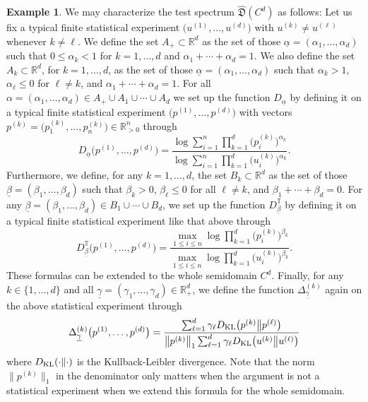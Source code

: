 \documentclass[12pt,a4paper,reqno]{amsart}
\theoremstyle{definition}
\newtheorem{example}[proposition]{Example}
\newcommand{\mf}[1]{\mathfrak{#1}}
\newcommand{\R}{\mathbb R}
\newcommand{\T}{\mathbb T}
\begin{document}
\begin{example}
We may characterize the test spectrum $\hat{\mf D}(C^d)$ as follows: Let us fix a typical finite statistical experiment $\big(u^{(1)},\ldots,u^{(d)}\big)$ with $u^{(k)}\neq u^{(\ell)}$ whenever $k\neq\ell$. We define the set $A_+\subset\R^d$ as the set of those $\underline{\alpha}=(\alpha_1,\ldots,\alpha_d)$ such that $0\leq\alpha_k<1$ for $k=1,\ldots,d$ and $\alpha_1+\cdots+\alpha_d=1$. We also define the set $A_k\subset\R^d$, for $k=1,\ldots,d$, as the set of those $\underline{\alpha}=(\alpha_1,\ldots,\alpha_d)$ such that $\alpha_k>1$, $\alpha_\ell\leq0$ for $\ell\neq k$, and $\alpha_1+\cdots+\alpha_d=1$. For all $\alpha=(\alpha_1,\ldots,\alpha_d)\in A_+\cup A_1\cup\cdots\cup A_d$ we set up the function $D_{\underline{\alpha}}$ by defining it on a typical finite statistical experiment $\big(p^{(1)},\ldots,p^{(d)}\big)$ with vectors $p^{(k)}=\big(p^{(k)}_1,\ldots,p^{(k)}_n\big)\in\R_{>0}^n$ through
\begin{equation}\label{eq:ClTemperate}
D_{\underline{\alpha}}\big(p^{(1)},\ldots,p^{(d)}\big)=\frac{\log{\sum_{i=1}^n\prod_{k=1}^d\big(p^{(k)}_i\big)^{\alpha_k}}}{\log{\sum_{i=1}^n\prod_{k=1}^d\big(u^{(k)}_i\big)^{\alpha_k}}}.
\end{equation}
Furthermore, we define, for any $k=1,\ldots,d$, the set $B_k\subset\R^d$ as the set of those $\underline{\beta}=(\beta_1,\ldots,\beta_d)$ such that $\beta_k>0$, $\beta_\ell\leq0$ for all $\ell\neq k$, and $\beta_1+\cdots+\beta_d=0$. For any $\underline{\beta}=(\beta_1,\ldots,\beta_d)\in B_1\cup\cdots\cup B_d$, we set up the function $D_{\underline{\beta}}^\T$ by defining it on a typical finite statistical experiment like that above through
\begin{equation}\label{eq:ClTropical}
D_{\underline{\beta}}^\T\big(p^{(1)},\ldots,p^{(d)}\big)=\frac{\max_{1\leq i\leq n}\log{\prod_{k=1}^d\big(p^{(k)}_i\big)^{\beta_k}}}{\max_{1\leq i\leq n}\log{\prod_{k=1}^d\big(u^{(k)}_i\big)^{\beta_k}}}.
\end{equation}
These formulas can be extended to the whole semidomain $C^d$. Finally, for any $k\in\{1,\ldots,d\}$ and all $\underline{\gamma}=(\gamma_1,\ldots,\gamma_d)\in\R_+^d$, we define the function $\Delta_{\underline{\gamma}}^{(k)}$ again on the above statistical experiment through
\begin{equation}\label{eq:ClDeriv}
\Delta_{\underline{\gamma}}^{(k)}\big(p^{(1)},\ldots,p^{(d)}\big)=\frac{\sum_{\ell=1}^d\gamma_\ell D_{\rm KL}\big(p^{(k)}\big\|p^{(\ell)}\big)}{\big\|p^{(k)}\big\|_1\sum_{\ell=1}^d\gamma_\ell D_{\rm KL}\big(u^{(k)}\big\|u^{(\ell)}\big)}
\end{equation}
where $D_{\rm KL}(\cdot\|\cdot)$ is the Kullback-Leibler divergence. Note that the norm $\big\|p^{(k)}\big\|_1$ in the denominator only matters when the argument is not a statistical experiment when we extend this formula for the whole semidomain.


\end{example}
\end{document}

